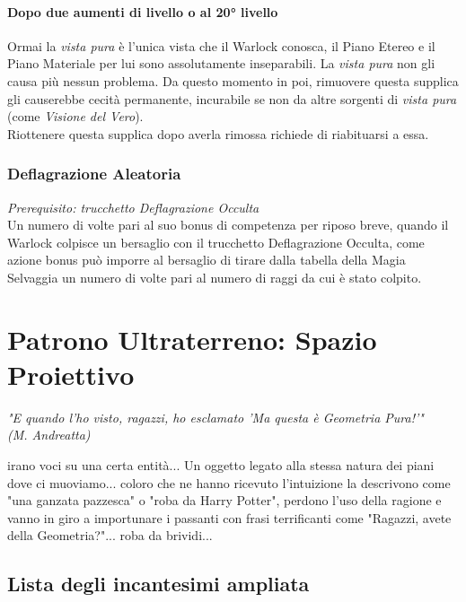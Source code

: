\paragraph{Dopo due aumenti di livello o al 20° livello} Ormai la \textit{vista pura} è l'unica vista che il Warlock conosca, il Piano Etereo e il Piano Materiale per lui sono assolutamente inseparabili. La \textit{vista pura} non gli causa più nessun problema. Da questo momento in poi, rimuovere questa supplica gli causerebbe cecità permanente, incurabile se non da altre sorgenti di \textit{vista pura} (come \textit{Visione del Vero}). \\
Riottenere questa supplica dopo averla rimossa richiede di riabituarsi a essa.

\subsubsection{Deflagrazione Aleatoria}
\textit{Prerequisito: trucchetto Deflagrazione Occulta} \\
Un numero di volte pari al suo bonus di competenza per riposo breve, quando il Warlock colpisce un bersaglio con il trucchetto Deflagrazione Occulta, come azione bonus può imporre al bersaglio di tirare dalla tabella della Magia Selvaggia un numero di volte pari al numero di raggi da cui è stato colpito.

\section{Patrono Ultraterreno: Spazio Proiettivo}

\begin{DndReadAloud}
  \it
  "E quando l'ho visto, ragazzi, ho esclamato 'Ma questa è Geometria Pura!'" \\ (M. Andreatta)
\end{DndReadAloud}

irano voci su una certa entità... Un oggetto legato alla stessa natura dei piani dove ci muoviamo... coloro che ne hanno ricevuto l'intuizione la descrivono come "una ganzata pazzesca" o "roba da Harry Potter", perdono l'uso della ragione e vanno in giro a importunare i passanti con frasi terrificanti come "Ragazzi, avete della Geometria?"... roba da brividi...

\subsection{Lista degli incantesimi ampliata}

